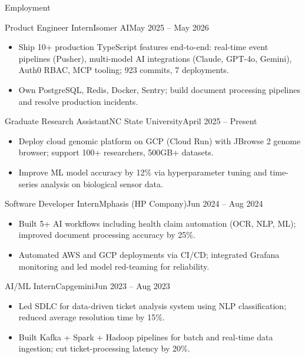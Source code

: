\documentclass[]{mcdowellcv}
\begin{document}
\makeheader

\begin{cvsection}{Employment}
  \begin{cvsubsection}{Product Engineer Intern}{Isomer AI}{May 2025 -- May 2026}
    \begin{itemize}
      \item Ship 10+ production TypeScript features end-to-end: real-time event pipelines (Pusher), multi-model AI integrations (Claude, GPT-4o, Gemini), Auth0 RBAC, MCP tooling; 923 commits, 7 deployments.
      \item Own PostgreSQL, Redis, Docker, Sentry; build document processing pipelines and resolve production incidents.
    \end{itemize}
    \vspace{-1.5pt}
  \end{cvsubsection}

  \begin{cvsubsection}{Graduate Research Assistant}{NC State University}{April 2025 -- Present}
    \begin{itemize}
      \item Deploy cloud genomic platform on GCP (Cloud Run) with JBrowse 2 genome browser; support 100+ researchers, 500GB+ datasets.
      \item Improve ML model accuracy by 12\% via hyperparameter tuning and time-series analysis on biological sensor data.
    \end{itemize}
    \vspace{-1.5pt}
  \end{cvsubsection}

  \begin{cvsubsection}{Software Developer Intern}{Mphasis (HP Company)}{Jun 2024 -- Aug 2024}
    \begin{itemize}
      \item Built 5+ AI workflows including health claim automation (OCR, NLP, ML); improved document processing accuracy by 25\%.
      \item Automated AWS and GCP deployments via CI/CD; integrated Grafana monitoring and led model red-teaming for reliability.
    \end{itemize}
    \vspace{-1.5pt}
  \end{cvsubsection}

  \begin{cvsubsection}{AI/ML Intern}{Capgemini}{Jun 2023 -- Aug 2023}
    \begin{itemize}
      \item Led SDLC for data-driven ticket analysis system using NLP classification; reduced average resolution time by 15\%.
      \item Built Kafka + Spark + Hadoop pipelines for batch and real-time data ingestion; cut ticket-processing latency by 20\%.
    \end{itemize}
    \vspace{-1.5pt}
  \end{cvsubsection}
\end{cvsection}
\end{document}
